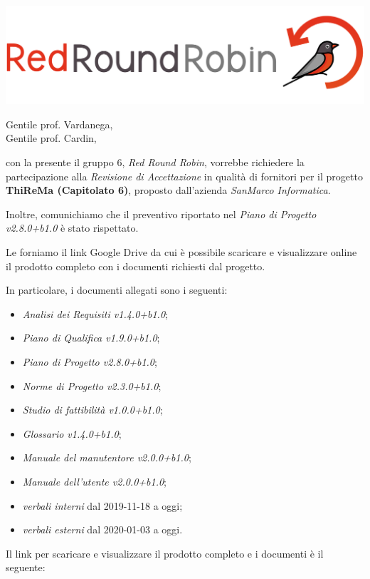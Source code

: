 \documentclass[12pt]{letter}
\date{15 maggio 2020}
\begin{document}
\begin{letter}{ }

\includegraphics[scale=0.17]{images/logo.png}

\opening{Gentile prof. Vardanega,\\ Gentile prof. Cardin, }

con la presente il gruppo 6, \textit{Red Round Robin}, vorrebbe richiedere la partecipazione alla \textit{Revisione di Accettazione} in qualità di fornitori per il progetto \textbf{ThiReMa (Capitolato 6)}, proposto dall'azienda \textit{SanMarco Informatica}.

Inoltre, comunichiamo che il preventivo riportato nel \textit{Piano di Progetto v2.8.0+b1.0} è stato rispettato.

Le forniamo il link Google Drive da cui è possibile scaricare e visualizzare online il prodotto completo con i documenti richiesti dal progetto.

In particolare, i documenti allegati sono i seguenti:

\begin{itemize}
  	\item \textit{Analisi dei Requisiti v1.4.0+b1.0};
	\item \textit{Piano di Qualifica v1.9.0+b1.0};
	\item \textit{Piano di Progetto v2.8.0+b1.0};
	\item \textit{Norme di Progetto v2.3.0+b1.0};
	\item \textit{Studio di fattibilità v1.0.0+b1.0};
	\item \textit{Glossario v1.4.0+b1.0};
	\item \textit{Manuale del manutentore v2.0.0+b1.0};
	\item \textit{Manuale dell'utente v2.0.0+b1.0};
	\item \textit{verbali interni} dal 2019-11-18 a oggi;
	\item \textit{verbali esterni} dal 2020-01-03 a oggi.	
\end{itemize}

Il link per scaricare e visualizzare il prodotto completo e i documenti è il seguente:


\end{letter}
\end{document}
